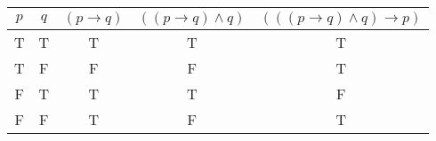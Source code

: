 \begin{tabular}{|c|c||c|c|c|}
\hline
$ p $ & $ q $ & $ (p \rightarrow q) $ & $ ((p \rightarrow q) \wedge q) $ & $ (((p \rightarrow q) \wedge q) \rightarrow p) $ \\
\hline
T & T & T & T & T \\
T & F & F & F & T \\
F & T & T & T & F \\
F & F & T & F & T \\
\hline
\end{tabular}
